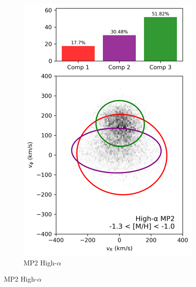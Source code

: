 \documentclass[a4paper,10pt]{article}
\begin{document}
\begin{multicols}{2}
\begin{figure}[H]
\begin{subfigure}[t]{0.24\linewidth}
    \includegraphics[width=\linewidth]{../figures/gmm_mp2_high_alpha_k6.png}
    \caption{MP2 High-$\alpha$}
  \end{subfigure}

  \vspace{0.5em}


\end{figure}
\end{multicols}
\end{document}
